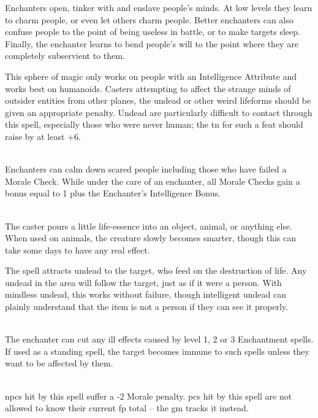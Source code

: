 \begin{multicols}{2}

\noindent
Enchanters open, tinker with and enslave people's minds. At low levels they learn to charm people, or even let others charm people. Better enchanters can also confuse people to the point of being useless in battle, or to make targets sleep. Finally, the enchanter learns to bend people's will to the point where they are completely subservient to them.

This sphere of magic only works on people with an Intelligence Attribute and works best on humanoids. Casters attempting to affect the strange minds of outsider entities from other planes, the undead or other weird lifeforms should be given an appropriate penalty. Undead are particularly difficult to contact through this spell, especially those who were never human; the \gls{tn} for such a feat should raise by at least +6.

\spelllevel

\\
Enchanters can calm down scared people including those who have failed a Morale Check.
While under the care of an enchanter, all Morale Checks gain a bonus equal to 1 plus the Enchanter's Intelligence Bonus.

\\
The caster pours a little life-essence into an object, animal, or anything else.
When used on animals, the creature slowly becomes smarter, though this can take some days to have any real effect.

The spell attracts undead to the target, who feed on the destruction of life.  Any undead in the area will follow the target, just as if it were a person.
With mindless undead, this works without failure, though intelligent undead can plainly understand that the item is not a person if they can see it properly.

\\
The enchanter can cut any ill effects caused by level 1, 2 or 3 Enchantment spells. If used as a standing spell, the target becomes immune to such spells unless they want to be affected by them.

\\
\Glspl{npc} hit by this spell suffer a -2 Morale penalty.  \Glspl{pc} hit by this spell are not allowed to know their current \gls{fp} total -- the \gls{gm} tracks it instead.


\end{multicols}
